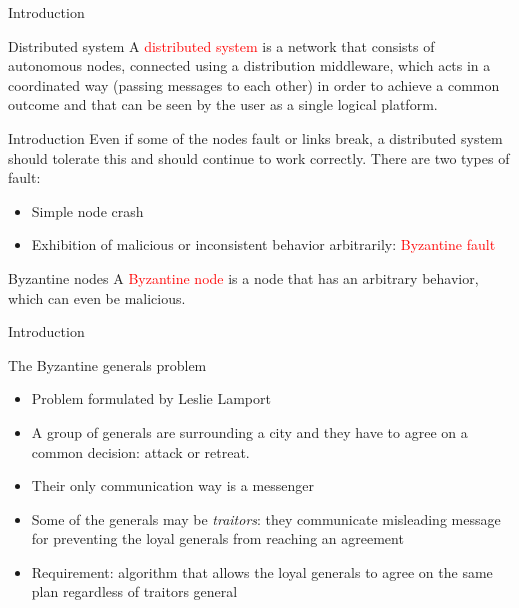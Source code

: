 \documentclass{beamer}
\newcommand\red[1]{\textcolor{red}{#1}}
\begin{document}
\begin{frame}{Introduction}
    \begin{block}{Distributed system}
    A \textcolor{red}{distributed system} is a network that consists of autonomous nodes,
    connected using a distribution middleware, which acts in a coordinated way
    (passing messages to each other) in order to achieve a common outcome and
    that can be seen by the user as a single logical platform.
    \end{block}
\end{frame}


  \begin{frame}{Introduction}
    Even if some of the nodes fault or links break, a distributed system should tolerate
    this and should continue to work correctly. There are two types of fault:
    \begin{itemize}
      \item Simple node crash
      \item Exhibition of malicious or inconsistent behavior arbitrarily: \red{Byzantine fault}
    \end{itemize}

    \pause 
    \begin{block}{Byzantine nodes}
      A \textcolor{red}{Byzantine node} is a node that has an arbitrary behavior,
      which can even be malicious.
    \end{block}
  \end{frame}
  
  
  
  
  \begin{frame}{Introduction}
        \begin{block}{The Byzantine generals problem}
          \begin{itemize}
            \item Problem formulated by Leslie Lamport \cite{lamport1982byzantine}
            \item A group of generals are surrounding a city and they have to agree
            on a common decision: attack or retreat.
            \item Their only communication way is a messenger
            \item Some of the generals may be \emph{traitors}: they communicate
            misleading message for preventing the loyal generals from reaching an
            agreement
            \item Requirement: algorithm that allows the loyal generals to agree
            on the same plan regardless of traitors general
          \end{itemize}
        \end{block}
    \end{frame}
\end{document}
